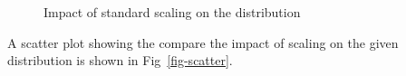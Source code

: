 \documentclass[
  letterpaper,
  DIV=11,
  numbers=noendperiod]{scrreprt}
\theoremstyle{plain}
\theoremstyle{definition}
\theoremstyle{remark}
\begin{document}
\begin{figure}[H]


\caption{\label{fig-comp1}Impact of standard scaling on the
distribution}

\end{figure}%

A scatter plot showing the compare the impact of scaling on the given
distribution is shown in Fig~\ref{fig-scatter}.
\end{document}
